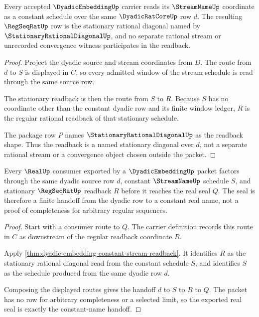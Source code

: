 \begin{theorem}
\label{thm:dyadic-embedding-constant-stream-readback}
Every accepted $\DyadicEmbeddingUp$ carrier reads its $\StreamNameUp$ coordinate as a constant schedule over the same $\DyadicRatCoreUp$ row $d$. The resulting $\RegSeqRatUp$ row is the stationary rational diagonal named by $\StationaryRationalDiagonalUp$, and no separate rational stream or unrecorded convergence witness participates in the readback.
\end{theorem}
\begin{proof}
Project the dyadic source and stream coordinates from $D$. The route from $d$ to $S$ is displayed in $C$, so every admitted window of the stream schedule is read through the same source row.

The stationary readback is then the route from $S$ to $R$. Because $S$ has no coordinate other than the constant dyadic row and its finite window ledger, $R$ is the regular rational readback of that stationary schedule.

The package row $P$ names $\StationaryRationalDiagonalUp$ as the readback shape. Thus the readback is a named stationary diagonal over $d$, not a separate rational stream or a convergence object chosen outside the packet.
\end{proof}

\begin{theorem}
\label{thm:dyadic-embedding-real-seal-handoff}
Every $\RealUp$ consumer exported by a $\DyadicEmbeddingUp$ packet factors through the same dyadic source row $d$, constant $\StreamNameUp$ schedule $S$, and stationary $\RegSeqRatUp$ readback $R$ before it reaches the real seal $Q$. The seal is therefore a finite handoff from the dyadic row to a constant real name, not a proof of completeness for arbitrary regular sequences.
\end{theorem}
\begin{proof}
Start with a consumer route to $Q$. The carrier definition records this route in $C$ as downstream of the regular readback coordinate $R$.

Apply \autoref{thm:dyadic-embedding-constant-stream-readback}. It identifies $R$ as the stationary rational diagonal read from the constant schedule $S$, and identifies $S$ as the schedule produced from the same dyadic row $d$.

Composing the displayed routes gives the handoff $d$ to $S$ to $R$ to $Q$. The packet has no row for arbitrary completeness or a selected limit, so the exported real seal is exactly the constant-name handoff.
\end{proof}

